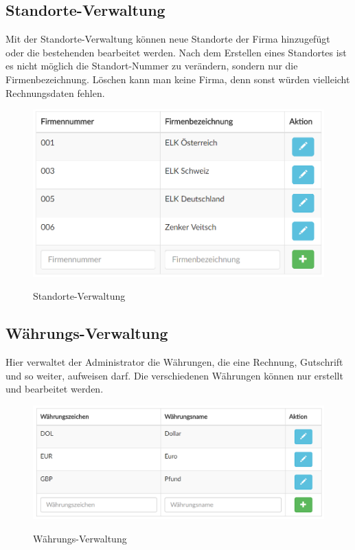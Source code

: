 \subsection{Standorte-Verwaltung}
Mit der Standorte-Verwaltung können neue Standorte der Firma hinzugefügt oder die bestehenden bearbeitet werden. Nach dem Erstellen eines Standortes ist es nicht möglich die Standort-Nummer zu verändern, sondern nur die Firmenbezeichnung. Löschen kann man keine Firma, denn sonst würden vielleicht Rechnungsdaten fehlen.
\begin{figure}[!h]
    \centering
    \includegraphics[width=15cm]{figures/standorte.png}
    \label{fig:standorteverwaltung}
    \caption{Standorte-Verwaltung}
\end{figure}
\newpage
\subsection{Währungs-Verwaltung}
Hier verwaltet der Administrator die Währungen, die eine Rechnung, Gutschrift und so weiter, aufweisen darf. Die verschiedenen Währungen können nur erstellt und bearbeitet werden.
\begin{figure}[!h]
    \centering
    \includegraphics[width=15cm]{figures/waehrungen.png}
    \label{fig:waehrungsverwaltung}
    \caption{Währungs-Verwaltung}
\end{figure}

